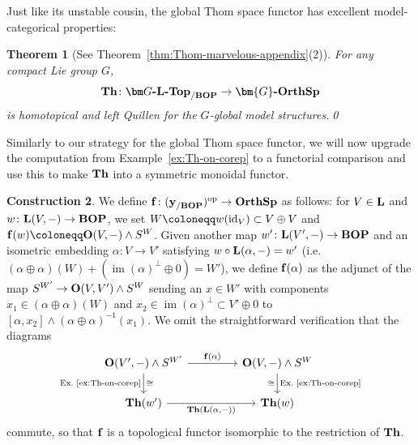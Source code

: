\documentclass[reqno]{memo-l}
\theoremstyle{mythm}
\newtheorem{thm}{Theorem}[section]
\theoremstyle{definition}
\newtheorem{constr}[thm]{Construction}
\numberwithin{equation}{section}
\newcommand{\cat}[1]{\textbf{\textup{#1}}}
\newcommand{\op}{{\textup{op}}}
\newcommand{\id}{\textup{id}}
\DeclareMathOperator{\im}{im}
\let\smashp=\wedge
\newcommand{\osp}{{\textbf{\textup{OrthSp}}}}
\newcommand{\Gosp}[1]{\cat{$\bm{#1}$-OrthSp}}
\begin{document}
Just like its unstable cousin, the global Thom space functor has excellent model-categorical properties:

\begin{thm}[See Theorem~\ref{thm:Thom-marvelous-appendix}(2)]\label{thm:thom-spectrum-marvelous}
    For any compact Lie group $G$,
    \[
        \cat{Th}\colon\cat{$\bm G$-$\cat{L}$-Top}_{/\cat{BOP}}\to\Gosp{G}
    \]
    is homotopical and left Quillen for the $G$-global model structures.\qed
\end{thm}

Similarly to our strategy for the global Thom space functor, we will now upgrade the computation from Example~\ref{ex:Th-on-corep} to a functorial comparison and use this to make $\cat{Th}$ into a symmetric monoidal functor.

\begin{constr}\label{constr:Th-on-corep}
    We define $\cat{f}\colon(\cat{y}_{/\cat{BOP}})^\op\to\osp$ as follows: for $V\in\cat{L}$ and $w\colon\cat{L}(V,-)\to\cat{BOP}$, we set $W\coloneqq w(\id_V)\subset V\oplus V$ and $\cat{f}(w)\coloneqq\cat{O}(V,-)\smashp S^{W}$. Given another map $w'\colon\cat{L}(V',-)\to\cat{BOP}$ and an isometric embedding $\alpha\colon V\to V'$ satisfying $w\circ\cat{L}(\alpha,-)=w'$ (i.e.\ $(\alpha\oplus\alpha)(W)+(\im(\alpha)^\perp\oplus0)=W'$), we define $\cat{f}(\alpha)$ as the adjunct of the map $S^{W'}\to\cat{O}(V,V')\smashp S^W$ sending an $x\in W'$ with components $x_1\in(\alpha\oplus\alpha)(W)$ and $x_2\in\im(\alpha)^\perp\subset V'\oplus 0$ to $[\alpha,x_2]\smashp (\alpha\oplus\alpha)^{-1}(x_1)$. We omit the straightforward verification that the diagrams
    \[
        \begin{tikzcd}
            \cat{O}(V',-)\smashp S^{W'}\arrow[r,"\cat{f}(\alpha)"]\arrow[d,"\cong","\text{Ex.~\ref{ex:Th-on-corep}}"'] &[2em] \cat{O}(V,-)\smashp S^W\arrow[d,"\cong"',"\text{Ex.~\ref{ex:Th-on-corep}}"]\\
            \cat{Th}(w')\arrow[r,"{\cat{Th}(\cat{L}(\alpha,-))}"'] & \cat{Th}(w)
        \end{tikzcd}
    \]
    commute, so that $\cat{f}$ is a topological functor isomorphic to the restriction of $\cat{Th}$.
\end{constr}
\end{document}
